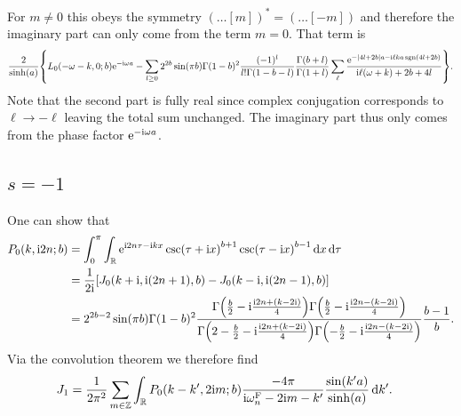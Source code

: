 \documentclass[english, parskip=full]{scrartcl}
\begin{document}
For $m\neq 0$ this obeys the symmetry $(\dots [m])^\ast = (\dots [-m])$ and therefore the imaginary part can only come from the term $m=0$.
That term is
\begin{align}
\frac{2}{\sinh(a)} \klc*{L_0(-\omega - k, 0; b) \powe{-\i\omega a} - \sum_{l\ge 0} 2^{2b} \sin(\pi b) \Gamma(1-b)^2 \frac{(-1)^l}{l!\Gamma(1-b-l)} \frac{\Gamma\kla*{b + l}}{\Gamma\kla*{1+l}} \sum_\ell \frac{\powe{-\abs*{4l+2b} a - \i \ell k a \sgn \kla*{4 l + 2 b}}}{\i\ell (\omega + k) + 2 b + 4 l}}.
\end{align}
Note that the second part is fully real since complex conjugation corresponds to $\ell\rightarrow-\ell$ leaving the total sum unchanged.
The imaginary part thus only comes from the phase factor $\text{e}^{-\text{i}\omega a}$.
\subsection{$s=-1$}
One can show that
\begin{align}
P_0(k, \i 2n; b) &= \intx{0}{\pi}{\intr{\powe{\i 2n \tau - \i kx} \csc(\tau+\i x)^{b+1}  \csc(\tau - \i x)^{b-1}}{x} }{\tau} \\
&= \frac{1}{2\i} \klb*{J_0(k+\i, \i (2n+1),b) - J_0(k-\i, \i (2n-1), b)} \\
&=2^{2b-2} \sin(\pi b) \Gamma(1-b)^2 \frac{\Gamma\kla*{\frac{b}{2} - \i \frac{\i 2n + (k-2\i) }{4}} \Gamma\kla*{\frac{b}{2} - \i \frac{\i 2n - (k-2\i)}{4}}}{\Gamma\kla*{2-\frac{b}{2} - \i \frac{\i 2n + (k-2\i)}{4}} \Gamma\kla*{-\frac{b}{2} - \i \frac{\i 2n - (k-2\i)}{4}}} \frac{b-1}{b}.
\end{align}
Via the convolution theorem we therefore find
\begin{align}
J_1 &= \frac{1}{2\pi^2} \sum_{m\in\mathbb{Z}} \int_{\mathbb{R}} P_0(k-k', 2\text{i} m; b) \frac{-4\pi}{\text{i}\omega_n^{\text{F}} - 2\text{i} m - k'} \frac{\sin(k'a)}{\sinh(a)} \, \mathrm{d}k'.
\end{align}
\end{document}
